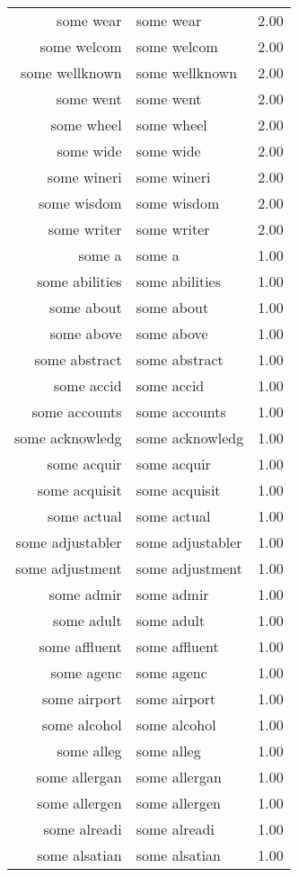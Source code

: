 \begin{table}[ht]
\begin{tabular}{rlr}
  some wear & some wear & 2.00 \\ 
  some welcom & some welcom & 2.00 \\ 
  some wellknown & some wellknown & 2.00 \\ 
  some went & some went & 2.00 \\ 
  some wheel & some wheel & 2.00 \\ 
  some wide & some wide & 2.00 \\ 
  some wineri & some wineri & 2.00 \\ 
  some wisdom & some wisdom & 2.00 \\ 
  some writer & some writer & 2.00 \\ 
  some a & some a & 1.00 \\ 
  some abilities & some abilities & 1.00 \\ 
  some about & some about & 1.00 \\ 
  some above & some above & 1.00 \\ 
  some abstract & some abstract & 1.00 \\ 
  some accid & some accid & 1.00 \\ 
  some accounts & some accounts & 1.00 \\ 
  some acknowledg & some acknowledg & 1.00 \\ 
  some acquir & some acquir & 1.00 \\ 
  some acquisit & some acquisit & 1.00 \\ 
  some actual & some actual & 1.00 \\ 
  some adjustabler & some adjustabler & 1.00 \\ 
  some adjustment & some adjustment & 1.00 \\ 
  some admir & some admir & 1.00 \\ 
  some adult & some adult & 1.00 \\ 
  some affluent & some affluent & 1.00 \\ 
  some agenc & some agenc & 1.00 \\ 
  some airport & some airport & 1.00 \\ 
  some alcohol & some alcohol & 1.00 \\ 
  some alleg & some alleg & 1.00 \\ 
  some allergan & some allergan & 1.00 \\ 
  some allergen & some allergen & 1.00 \\ 
  some alreadi & some alreadi & 1.00 \\ 
  some alsatian & some alsatian & 1.00 \\ 

\end{tabular}
\end{table}
